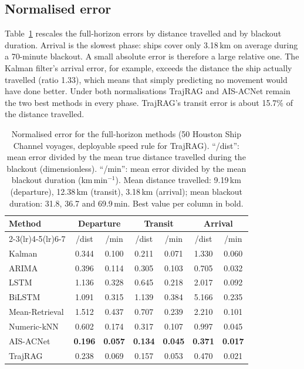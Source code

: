 \subsection{Normalised error}

Table~\ref{tab:normalized} rescales the full-horizon errors by distance
travelled and by blackout duration. Arrival is the slowest phase: ships
cover only 3.18\,km on average during a 70-minute blackout. A small absolute
error is therefore a large relative one. The Kalman filter's arrival error,
for example, exceeds the distance the ship actually travelled (ratio 1.33),
which means that simply predicting no movement would have done better.
Under both normalisations TrajRAG and AIS-ACNet remain the two best methods
in every phase. TrajRAG's transit error is about 15.7\% of the distance
travelled.

\begin{table}[t]
\centering
\caption{Normalised error for the full-horizon methods (50 Houston Ship
Channel voyages, deployable speed rule for TrajRAG). ``/dist'': mean error
divided by the mean true distance travelled during the blackout
(dimensionless). ``/min'': mean error divided by the mean blackout duration
(km\,min$^{-1}$). Mean distance travelled: 9.19\,km (departure), 12.38\,km
(transit), 3.18\,km (arrival); mean blackout duration: 31.8, 36.7 and
69.9\,min. Best value per column in bold.}
\label{tab:normalized}
\footnotesize
\setlength{\tabcolsep}{4pt}
\begin{tabular}{lcccccc}
\toprule
\multirow{2}{*}{Method} & \multicolumn{2}{c}{Departure} & \multicolumn{2}{c}{Transit} & \multicolumn{2}{c}{Arrival} \\
\cmidrule(lr){2-3}\cmidrule(lr){4-5}\cmidrule(lr){6-7}
 & /dist & /min & /dist & /min & /dist & /min \\
\midrule
Kalman & 0.344 & 0.100 & 0.211 & 0.071 & 1.330 & 0.060 \\
ARIMA & 0.396 & 0.114 & 0.305 & 0.103 & 0.705 & 0.032 \\
LSTM & 1.136 & 0.328 & 0.645 & 0.218 & 2.017 & 0.092 \\
BiLSTM & 1.091 & 0.315 & 1.139 & 0.384 & 5.166 & 0.235 \\
Mean-Retrieval & 1.512 & 0.437 & 0.707 & 0.239 & 2.210 & 0.101 \\
Numeric-kNN & 0.602 & 0.174 & 0.317 & 0.107 & 0.997 & 0.045 \\
AIS-ACNet & \textbf{0.196} & \textbf{0.057} & \textbf{0.134} & \textbf{0.045} & \textbf{0.371} & \textbf{0.017} \\
TrajRAG & 0.238 & 0.069 & 0.157 & 0.053 & 0.470 & 0.021 \\
\bottomrule
\end{tabular}
\end{table}

